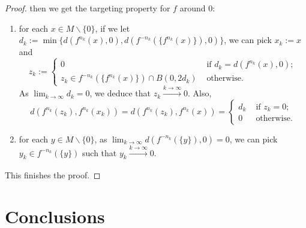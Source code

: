\documentclass[12pt,english]{amsart}
\numberwithin{equation}{section}
\theoremstyle{plain}
\theoremstyle{definition}
\begin{document}
\begin{proof}
then we get the targeting property for $f$ around $0$:
\begin{enumerate}
\item[(i)] for each $x\in M\backslash \{0\}$, if we let $d_k:=\min\{d(f^{n_k}(x),0), d(f^{-n_k}(\{f^{n_k}(x)\}),0)\}$, we can pick $x_k:=x$ and 
\begin{equation*}
    z_k:= \begin{cases}
       0 & \text{ if } d_k=d(f^{n_k}(x),0); \\
       z_k\in f^{-n_k}(\{f^{n_k}(x)\}) \cap  B(0,2d_k) & \text{ otherwise.}
    \end{cases}
\end{equation*}
 As $\lim_{k\to\infty} d_k=0$, we deduce that $z_k\xrightarrow{k\to \infty}0$. Also,
 \[d(f^{n_k}(z_k),f^{n_k}(x_k))= d(f^{n_k}(z_k),f^{n_k}(x)) = 
 \begin{cases}
       d_k & \text{ if } z_k=0; \\
      0 & \text{ otherwise}.
 \end{cases}\]
\item[(ii)] for each $y\in M\backslash \{0\}$, as $\lim_{k\to\infty} d(f^{-n_k}(\{y\}),0)=0$, we can pick $y_k\in f^{-n_k}(\{y\})$ such that $y_k\xrightarrow[]{k\to\infty} 0$.
\end{enumerate}
This finishes the proof.
\end{proof}



\section{Conclusions}
\end{document}
